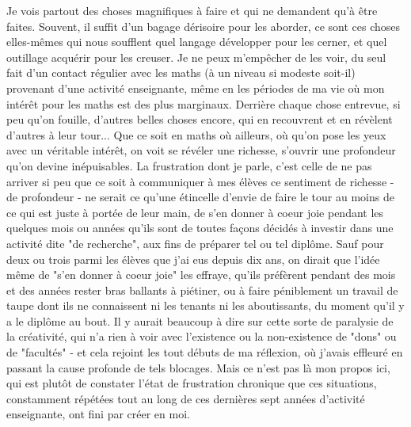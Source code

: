 Je vois partout des choses magnifiques à faire et qui ne demandent qu'à être faites. Souvent, il suffit d'un bagage dérisoire pour les aborder, ce sont ces choses elles-mêmes qui nous soufflent quel langage développer pour les cerner, et quel outillage acquérir pour les creuser. Je ne peux m'empêcher de les voir, du seul fait d'un contact régulier avec les maths (à un niveau si modeste soit-il) provenant d'une activité enseignante, même en les périodes de ma vie où mon intérêt pour les maths est des plus marginaux. Derrière chaque chose entrevue, si peu qu'on fouille, d'autres belles choses encore, qui en recouvrent et en révèlent d'autres à leur tour... Que ce soit en maths où ailleurs, où qu’on pose les yeux avec un véritable intérêt, on voit se révéler une richesse, s'ouvrir une profondeur qu'on devine inépuisables. La frustration dont je parle, c'est celle de ne pas arriver si peu que ce soit à communiquer à mes élèves ce sentiment de richesse - de profondeur - ne serait ce qu’une étincelle d'envie de faire le tour au moins de ce qui est juste à portée de leur main, de s'en donner à coeur joie pendant les quelques mois ou années qu'ils sont de toutes façons décidés à investir dans une activité dite "de recherche", aux fins de préparer tel ou tel diplôme. Sauf pour deux ou trois parmi les élèves que j’ai eus depuis dix ans, on dirait que l'idée même de "s'en donner à coeur joie" les effraye, qu'ils préfèrent pendant des mois et des années rester bras ballants à piétiner, ou à faire péniblement un travail de taupe dont ils ne connaissent ni les tenants ni les aboutissants, du moment qu’il y a le diplôme au bout. Il y aurait beaucoup à dire sur cette sorte de paralysie de la créativité, qui n'a rien à voir avec l'existence ou la non-existence de "dons" ou de "facultés" - et cela rejoint les tout débuts de ma réflexion, où j'avais effleuré en passant la cause profonde de tels blocages. Mais ce n'est pas là mon propos ici, qui est plutôt de constater l'état de frustration chronique que ces situations, constamment répétées tout au long de ces dernières sept années d'activité enseignante, ont fini par créer en moi.

